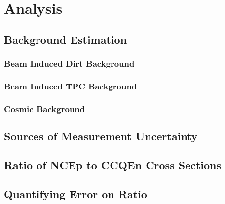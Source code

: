 \section{Analysis}\label{analysis}
\hspace{\parindent}

\subsection{Background Estimation}\label{background}
  \subsubsection{Beam Induced Dirt Background}
  \subsubsection{Beam Induced TPC Background}
  \subsubsection{Cosmic Background}

\subsection{Sources of Measurement Uncertainty}\label{uncertainties}

\subsection{Ratio of NCEp to CCQEn Cross Sections}\label{ratios}

\subsection{Quantifying Error on Ratio}\label{errorcalc}

